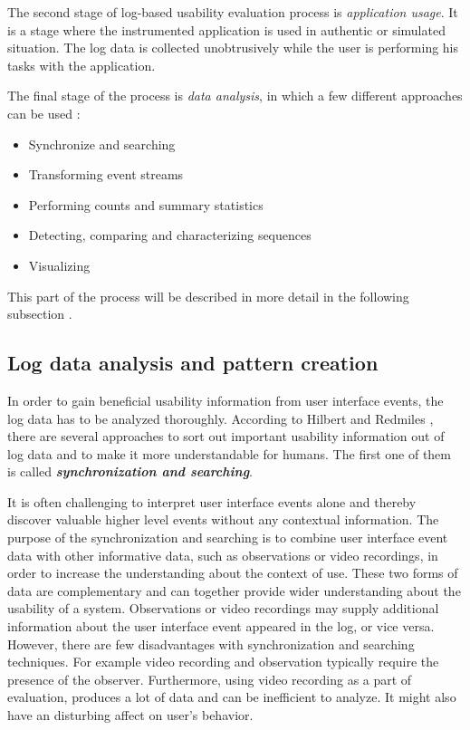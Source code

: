 \documentclass[12pt,a4paper,oneside,pdftex]{report}
\begin{document}
The second stage of log-based usability evaluation process is \emph{application usage}. It is a stage where the instrumented application is used in authentic or simulated situation. The log data is collected unobtrusively while the user is performing his tasks with the application. \cite{RefWorks:24}

The final stage of the process is \emph{data analysis}, in which a few different approaches can be used \cite{RefWorks:24, RefWorks:25}:
\begin{itemize}
  \item Synchronize and searching
  \item Transforming event streams
  \item Performing counts and summary statistics
  \item Detecting, comparing and characterizing sequences 
  \item Visualizing
\end{itemize}
This part of the process will be described in more detail in the following subsection .



\subsection{Log data analysis and pattern creation}
\label{sec:analysis}
 In order to gain beneficial usability information from user interface events, the log data has to be analyzed thoroughly. According to  Hilbert and Redmiles \cite{RefWorks:25}, there are several approaches to sort out important usability information out of log data and to make it more understandable for humans.
The first one of them is called \textbf{\emph{synchronization and searching}}. 

It is often challenging to interpret user interface events alone and thereby discover valuable higher level events without any contextual information. The purpose of the synchronization and searching is to combine user interface event data with other informative data, such as observations or video recordings, in order to increase the understanding about the context of use. These two forms of data are complementary and can together provide wider understanding about the usability of a system. Observations or video recordings may supply additional information about the user interface event appeared in the log, or vice versa. However, there are few disadvantages with synchronization and searching techniques. For example video recording and observation typically require the presence of the observer. Furthermore, using video recording as a part of evaluation, produces a lot of data and can be inefficient to analyze. It might also have an disturbing affect on user's behavior. \cite{RefWorks:25}
\end{document}

